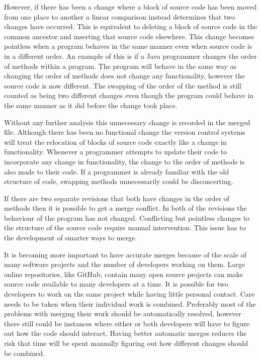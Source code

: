 However, if there has been a change where a block of source code has been moved from one place to another a linear comparison instead determines that two changes have occurred.  This is equivalent to deleting a block of source code in the common ancestor and inserting that source code elsewhere. This change becomes pointless when a program behaves in the same manner even when source code is in a different order.  An example of this is if a Java programmer changes the order of methods within a program.  The program will behave in the same way as changing the order of methods does not change any functionality, however the source code is now different. The swapping of the order of the method is still counted as being two different changes even though the program could behave in the same manner as it did before the change took place.

Without any further analysis this unnecessary change is recorded in the merged file.  Although there has been no functional change the version control systems will treat the relocation of blocks of source code exactly like a change in functionality.  Whenever a programmer attempts to update their code to incorporate any change in functionality, the change to the order of methods is also made to their code.  If a programmer is already familiar with the old structure of code, swapping methods unnecessarily could be disconcerting.

If there are two separate revisions that both have changes in the order of methods then it is possible to get a merge conflict. In both of the revisions the behaviour of the program has not changed. Conflicting but pointless changes to the structure of the source code require manual intervention. This issue has to the development of smarter ways to merge.

It is becoming more important to have accurate merges because of the scale of many software projects and the number of developers working on them.  Large online repositories, like GitHub, contain many open source projects can make source code available to many developers at a time.  It is possible for two developers to work on the same project while having little personal contact. Care needs to be taken when their individual work is combined.  Preferably most of the problems with merging their work should be automatically resolved, however there still could be instances where either or both developers will have to figure out how the code should interact. Having better automatic merges reduces the risk that time will be spent manually figuring out how different changes should be combined.

